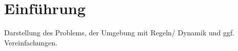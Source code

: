 \chapter{Einführung} \label{chapter:1}
Darstellung des Problems, der Umgebung mit Regeln/ Dynamik und ggf. Vereinfachungen.

